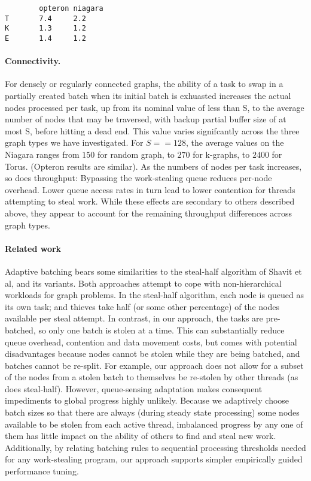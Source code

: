 {\footnotesize
\begin{verbatim}
        opteron niagara
T       7.4     2.2
K       1.3     1.2
E       1.4     1.2
\end{verbatim}}

\paragraph{Connectivity.}  For densely or regularly connected graphs, the
ability of a task to swap in a partially created batch when its
initial batch is exhuasted increases the actual nodes processed per
task, up from its nominal value of less than S, to the average number
of nodes that may be traversed, with backup partial buffer size of at
most S, before hitting a dead end. This value varies signifcantly
across the three graph types we have investigated. For $S==128$, the
average values on the Niagara ranges from $150$ for random graph, to $270$
for k-graphs, to $2400$ for Torus. (Opteron results are similar). As the
numbers of nodes per task increases, so does throughput: Bypassing the
work-stealing queue reduces per-node overhead.  Lower queue access
rates in turn lead to lower contention for threads attempting to steal
work. While these effects are secondary to others described above,
they appear to account for the remaining throughput differences across
graph types.


\paragraph{Related work}
Adaptive batching bears some similarities to the steal-half algorithm
of Shavit et al, and its variants. Both approaches attempt to cope
with non-hierarchical workloads for graph problems. In the steal-half
algorithm, each node is queued as its own task; and thieves take half
(or some other percentage) of the nodes available per steal
attempt. In contrast, in our approach, the tasks are pre-batched, so
only one batch is stolen at a time. This can substantially reduce
queue overhead, contention and data movement costs, but comes with
potential disadvantages because nodes cannot be stolen while they are
being batched, and batches cannot be re-split.  For example, our
approach does not allow for a subset of the nodes from a stolen batch
to themselves be re-stolen by other threads (as does
steal-half). However, queue-sensing adaptation makes consequent
impediments to global progress highly unlikely.  Because we adaptively
choose batch sizes so that there are always (during steady state
processing) some nodes available to be stolen from each active thread,
imbalanced progress by any one of them has little impact on the
ability of others to find and steal new work.  Additionally, by
relating batching rules to sequential processing thresholds needed for
any work-stealing program, our approach supports simpler empirically
guided performance tuning.



